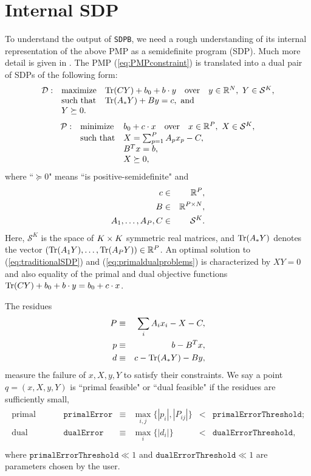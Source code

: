 \documentclass[12pt]{article}
\numberwithin{equation}{section}
\renewcommand{\be}{\begin{eqnarray}}
\renewcommand{\ee}{\end{eqnarray}}
\newcommand\nn\nonumber
\newcommand\cS{\mathcal{S}}
\newcommand\SDPB{\texttt{SDPB}}
\begin{document}
\section{Internal SDP}
\label{sec:translationPMPtoSDP}

To understand the output of \SDPB, we need a rough understanding of its internal representation of the above PMP as a semidefinite program (SDP).  Much more detail is given in \cite{DSD}.
The PMP (\ref{eq:PMPconstraint}) is translated into a dual pair of SDPs of the following form:
\be
\label{eq:traditionalSDP}
\begin{array}{rll}
\cD: & \textrm{maximize} & \Tr(CY) + b_0 + b \. y \quad \textrm{over} \quad y\in \R^N,\ Y\in \cS^K, \\
& \textrm{such that} & \Tr(A_* Y)+By = c,\ \textrm{and}\\
& Y \succeq 0.
\end{array}
\ee 
\be
\label{eq:primaldualproblems}
\begin{array}{rll}
\mathcal{P}: & \textrm{minimize} & b_0+c\.x \quad \textrm{over}\quad x\in \R^P,\ X\in \cS^K,\\
& \textrm{such that} & X= \sum_{p=1}^P A_p x_p - C,\\
& &  B^T x= b,\\
& &  X\succeq 0,
\end{array}
\ee
where ``$\succeq 0$" means ``is positive-semidefinite" and
\be
c &\in& \R^P, \nn\\
B &\in& \R^{P\x N}, \nn\\
A_1,\dots,A_P,C &\in& \cS^K.
\ee
Here, $\cS^K$ is the space of $K\times K$ symmetric real matrices, and $\mathrm{Tr}(A_* Y)$ denotes the vector $(\mathrm{Tr}(A_1 Y),\dots,\mathrm{Tr}(A_P Y))\in\mathbb{R}^P$.  An optimal solution to (\ref{eq:traditionalSDP}) and (\ref{eq:primaldualproblems}) is characterized by $XY=0$ and also equality of the primal and dual objective functions $\mathrm{Tr}(CY)+b_0+b\cdot y=b_0+c\cdot x$.

The residues
\be
\label{eq:residues}
P &\equiv& \sum_i A_i x_i - X - C, \nn\\
p &\equiv& b - B^T x, \nn\\
d &\equiv& c - \Tr(A_* Y) - B y,
\ee
measure the failure of $x,X,y,Y$ to satisfy their constraints.  We say a point $q=(x,X,y,Y)$ is ``primal feasible" or ``dual feasible" if the residues are sufficiently small, 
\be
\begin{array}{rrcccl}
\textrm{primal feasible:} & \texttt{primalError} &\equiv& \max_{i,j}\{|p_i|, |P_{ij}|\} &<& \texttt{primalErrorThreshold};\\
\textrm{dual feasible:} & \texttt{dualError} &\equiv&\max_i\{|d_i|\} &<& \texttt{dualErrorThreshold},\nn\\
\end{array}
\ee
where $\texttt{primalErrorThreshold}\ll 1$ and $\texttt{dualErrorThreshold} \ll 1$ are parameters chosen by the user.
\end{document}
